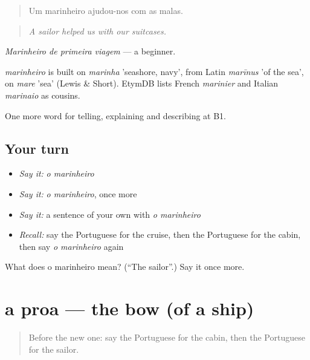 \begin{quote}
Um marinheiro ajudou-nos com as malas.
\end{quote}

\begin{quote}
\emph{A sailor helped us with our suitcases.}
\end{quote}

\emph{Marinheiro de primeira viagem} — a beginner.

\begin{cousinweb}
\emph{marinheiro} is built on \emph{marinha} 'seashore, navy', from Latin \emph{marīnus} 'of the sea', on \emph{mare} 'sea' (Lewis \& Short). EtymDB lists French \emph{marinier} and Italian \emph{marinaio} as cousins.
\end{cousinweb}

\begin{grammarlens}[title={What you've built}]
One more word for telling, explaining and describing at B1.
\end{grammarlens}

\subsection*{Your turn}
\begin{itemize}
\raggedright
  \item \emph{Say it:} \emph{o marinheiro}
  \item \emph{Say it:} \emph{o marinheiro}, once more
  \item \emph{Say it:} a sentence of your own with \emph{o marinheiro}
  \item \emph{Recall:} say the Portuguese for the cruise, then the Portuguese for the cabin, then say \emph{o marinheiro} again
\end{itemize}

\begin{tcolorbox}[breakable,colback=teal!4,colframe=teal!35!black,title={Before you move on}]
What does o marinheiro mean? (\textquotedblleft{}The sailor\textquotedblright{}.) Say it once more.
\end{tcolorbox}
\section[a proa]{a proa — the bow (of a ship)}

\label{lesson:PT-C419-proa}



\begin{quote}
Before the new one: say the Portuguese for the cabin, then the Portuguese for the sailor.
\end{quote}

